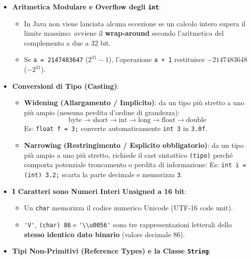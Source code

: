 \documentclass[11pt,a4paper]{article}
\newcommand{\passthrough}[1]{#1}
\providecommand{\tightlist}{\setlength{\itemsep}{0pt}\setlength{\parskip}{0pt}}
\begin{document}
\begin{itemize}
\tightlist
\item
  \textbf{Aritmetica Modulare e Overflow degli
  \passthrough{\lstinline!int!}}:

  \begin{itemize}
  \tightlist
  \item
    In Java non viene lanciata alcuna eccezione se un calcolo intero
    supera il limite massimo: avviene il \textbf{wrap-around} secondo
    l'aritmetica del complemento a due a 32 bit.
  \item
    Se \passthrough{\lstinline!a = 2147483647!} (\(2^{31}-1\)),
    l'operazione \passthrough{\lstinline!a + 1!} restituisce
    \(-2147483648\) (\(-2^{31}\)).
  \end{itemize}
\item
  \textbf{Conversioni di Tipo (Casting)}:

  \begin{itemize}
  \tightlist
  \item
    \textbf{Widening (Allargamento / Implicito)}: da un tipo più stretto
    a uno più ampio (nessuna perdita d'ordine di grandezza):
    \[\text{byte} \longrightarrow \text{short} \longrightarrow \text{int} \longrightarrow \text{long} \longrightarrow \text{float} \longrightarrow \text{double}\]
    Es: \passthrough{\lstinline!float f = 3;!} converte automaticamente
    \passthrough{\lstinline!int 3!} in \passthrough{\lstinline!3.0f!}.
  \item
    \textbf{Narrowing (Restringimento / Esplicito obbligatorio)}: da un
    tipo più ampio a uno più stretto, richiede il cast sintattico
    \passthrough{\lstinline!(tipo)!} perché comporta potenziale
    troncamento o perdita di informazione: Es:
    \passthrough{\lstinline!int i = (int) 3.2;!} scarta la parte
    decimale e memorizza \passthrough{\lstinline!3!}.
  \end{itemize}
\item
  \textbf{I Caratteri sono Numeri Interi Unsigned a 16 bit}:

  \begin{itemize}
  \tightlist
  \item
    Un \passthrough{\lstinline!char!} memorizza il codice numerico
    Unicode (UTF-16 code unit).
  \item
    \passthrough{\lstinline!'V'!}, \passthrough{\lstinline!(char) 86!} e
    \passthrough{\lstinline!'\\u0056'!} sono tre rappresentazioni
    letterali dello \textbf{stesso identico dato binario} (valore
    decimale 86).
  \end{itemize}
\item
  \textbf{Tipi Non-Primitivi (Reference Types) e la Classe
  \passthrough{\lstinline!String!}}:


\end{itemize}
\end{document}
